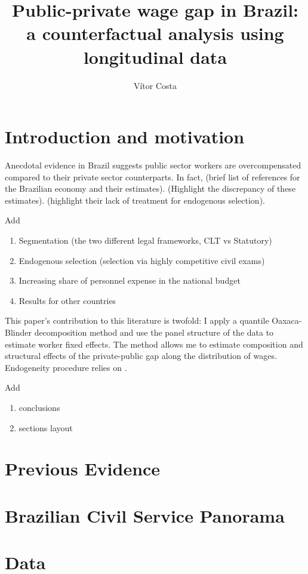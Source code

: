 \documentclass{article}
\title{Public-private wage gap in Brazil: a counterfactual analysis using longitudinal data}
\author{Vítor Costa}
\date
\begin{document}
\maketitle
\tableofcontents

\section{Introduction and motivation}
Anecdotal evidence in Brazil suggests public sector workers are overcompensated compared to their private sector counterparts. In fact, (brief list of references for the Brazilian economy and their estimates). (Highlight the discrepancy of these estimates). (highlight their lack of treatment for endogenous selection).

Add
\begin{enumerate}
    \item Segmentation (the two different legal frameworks, CLT vs Statutory)
    \item Endogenous selection (selection via highly competitive civil exams)
    \item Increasing share of personnel expense in the national budget 
    \item Results for other countries
\end{enumerate}


This paper's contribution to this literature is twofold: I apply a quantile Oaxaca-Blinder decomposition method and use the panel structure of the data to estimate worker fixed effects. The method allows me to estimate composition and structural effects of the private-public gap along the distribution of wages. Endogeneity procedure relies on \cite{canay_simple_2011}.  

Add 
\begin{enumerate}
    \item conclusions
    \item sections layout 
\end{enumerate}

\section{Previous Evidence}

\section{Brazilian Civil Service Panorama}

\section{Data}
\end{document}
